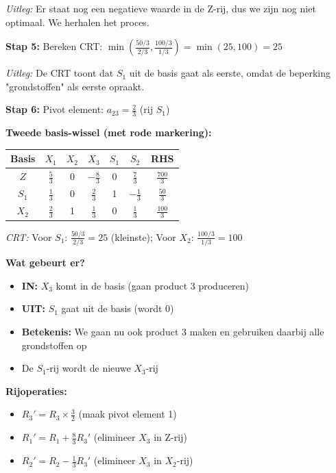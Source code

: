 \documentclass[a4paper,11pt]{article}
\begin{document}
\begin{oefenblok}[title=Productie Optimalisatie bij een Bedrijf]
\textit{Uitleg:} Er staat nog een negatieve waarde in de Z-rij, dus we zijn nog niet optimaal. We herhalen het proces.

\textbf{Stap 5:} Bereken CRT: $\min\left(\frac{50/3}{2/3}, \frac{100/3}{1/3}\right) = \min(25, 100) = 25$

\textit{Uitleg:} De CRT toont dat $S_1$ uit de basis gaat als eerste, omdat de beperking "grondstoffen" als eerste opraakt.

\textbf{Stap 6:} Pivot element: $a_{23} = \frac{2}{3}$ (rij $S_1$)

\textbf{Tweede basis-wissel (met rode markering):}

\begin{center}
\begin{tabular}{c|ccccc|c}
\hline
Basis & $X_1$ & $X_2$ & $X_3$ & $S_1$ & $S_2$ & RHS \\
\hline
$Z$ & $\frac{5}{3}$ & 0 & \cellcolor{red!20}$-\frac{8}{3}$ & 0 & $\frac{7}{3}$ & $\frac{700}{3}$ \\
\rowcolor{red!20}
$S_1$ & $\frac{1}{3}$ & 0 & \textbf{$\frac{2}{3}$} & 1 & $-\frac{1}{3}$ & $\frac{50}{3}$ \\
$X_2$ & $\frac{2}{3}$ & 1 & \cellcolor{red!20}$\frac{1}{3}$ & 0 & $\frac{1}{3}$ & $\frac{100}{3}$ \\
\hline
\end{tabular}
\end{center}

\textit{CRT:} Voor $S_1$: $\frac{50/3}{2/3} = 25$ (kleinste); Voor $X_2$: $\frac{100/3}{1/3} = 100$

\textbf{Wat gebeurt er?}
\begin{itemize}
    \item \textbf{IN:} $X_3$ komt in de basis (gaan product 3 produceren)
    \item \textbf{UIT:} $S_1$ gaat uit de basis (wordt 0)
    \item \textbf{Betekenis:} We gaan nu ook product 3 maken en gebruiken daarbij alle grondstoffen op
    \item De $S_1$-rij wordt de nieuwe $X_3$-rij
\end{itemize}

\textbf{Rijoperaties:}
\begin{itemize}
    \item $R_3' = R_3 \times \frac{3}{2}$ (maak pivot element 1)
    \item $R_1' = R_1 + \frac{8}{3}R_3'$ (elimineer $X_3$ in Z-rij)
    \item $R_2' = R_2 - \frac{1}{3}R_3'$ (elimineer $X_3$ in $X_2$-rij)
\end{itemize}


\end{oefenblok}
\end{document}
